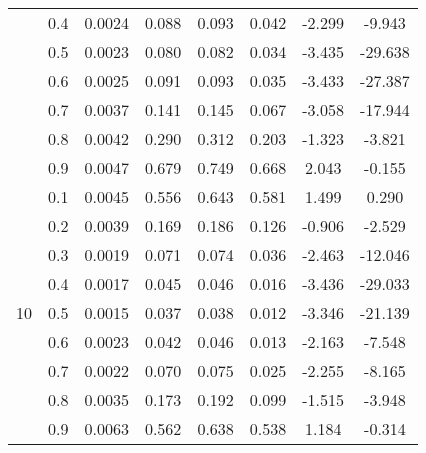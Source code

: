 \documentclass[11pt,a4paper]{report}
\begin{document}
\begin{longtable}{ | c | c || c | c | c | c | c | c | }
 & 0.4 & 0.0024 & 0.088 & 0.093 & 0.042 & -2.299 & -9.943 \\
 & 0.5 & 0.0023 & 0.080 & 0.082 & 0.034 & -3.435 & -29.638 \\
 & 0.6 & 0.0025 & 0.091 & 0.093 & 0.035 & -3.433 & -27.387 \\
 & 0.7 & 0.0037 & 0.141 & 0.145 & 0.067 & -3.058 & -17.944 \\
 & 0.8 & 0.0042 & 0.290 & 0.312 & 0.203 & -1.323 & -3.821 \\
 & 0.9 & 0.0047 & 0.679 & 0.749 & 0.668 & 2.043 & -0.155 \\
 \hline
\multirow{9}{*}{10} & 0.1 & 0.0045 & 0.556 & 0.643 & 0.581 & 1.499 & 0.290 \\
 & 0.2 & 0.0039 & 0.169 & 0.186 & 0.126 & -0.906 & -2.529 \\
 & 0.3 & 0.0019 & 0.071 & 0.074 & 0.036 & -2.463 & -12.046 \\
 & 0.4 & 0.0017 & 0.045 & 0.046 & 0.016 & -3.436 & -29.033 \\
 & 0.5 & 0.0015 & 0.037 & 0.038 & 0.012 & -3.346 & -21.139 \\
 & 0.6 & 0.0023 & 0.042 & 0.046 & 0.013 & -2.163 & -7.548 \\
 & 0.7 & 0.0022 & 0.070 & 0.075 & 0.025 & -2.255 & -8.165 \\
 & 0.8 & 0.0035 & 0.173 & 0.192 & 0.099 & -1.515 & -3.948 \\
 & 0.9 & 0.0063 & 0.562 & 0.638 & 0.538 & 1.184 & -0.314 \\
 \hline
\hline
\end{longtable}
\end{document}
